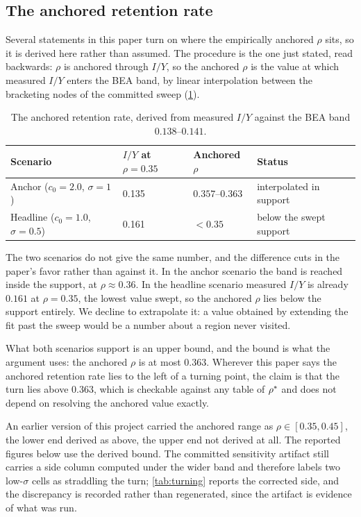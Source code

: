 \subsection{The anchored retention rate}
\label{sec:anchoredrho}

Several statements in this paper turn on where the empirically anchored
$\rho$ sits, so it is derived here rather than assumed. The procedure is the
one just stated, read backwards: $\rho$ is anchored through $I/Y$, so the
anchored $\rho$ is the value at which measured $I/Y$ enters the BEA band, by
linear interpolation between the bracketing nodes of the committed sweep
(\cref{tab:anchoredrho}).

\begin{table}[htbp]
\centering
\small
\caption{The anchored retention rate, derived from measured $I/Y$ against the
BEA band $0.138$--$0.141$.}
\label{tab:anchoredrho}
\begin{tabular}{llll}
\toprule
Scenario & $I/Y$ at $\rho = 0.35$ & Anchored $\rho$ & Status\\
\midrule
Anchor ($c_0 = 2.0$, $\sigma = 1$) & 0.135 & $0.357$--$0.363$ & interpolated
in support\\
Headline ($c_0 = 1.0$, $\sigma = 0.5$) & 0.161 & $< 0.35$ & below the
swept support\\
\bottomrule
\end{tabular}
\end{table}

The two scenarios do not give the same number, and the difference cuts in the
paper's favor rather than against it. In the anchor scenario the band is
reached inside the support, at $\rho \approx 0.36$. In the headline scenario
measured $I/Y$ is already $0.161$ at $\rho = 0.35$, the lowest value
swept, so the anchored $\rho$ lies below the support entirely. We decline to
extrapolate it: a value obtained by extending the fit past the sweep would be a
number about a region never visited.

What both scenarios support is an upper bound, and the bound is what the
argument uses: the anchored $\rho$ is at most $0.363$. Wherever this
paper says the anchored retention rate lies to the left of a turning point, the
claim is that the turn lies above $0.363$, which is checkable against any table
of $\rho^{\ast}$ and does not depend on resolving the anchored value exactly.

\begin{remark}
An earlier version of this project carried the anchored range as
$\rho \in [0.35, 0.45]$, the lower end derived as above, the upper end
not derived at all. The reported figures below use the derived bound.
The committed sensitivity artifact still carries a side column computed under
the wider band and therefore labels two low-$\sigma$ cells as straddling the
turn; \cref{tab:turning} reports the corrected side, and the discrepancy is
recorded rather than regenerated, since the artifact is evidence of what was
run.
\end{remark}

